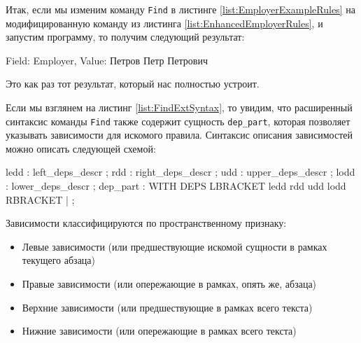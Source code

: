 Итак, если мы изменим команду \lstinline{Find} в листинге \ref{list:EmployerExampleRules} на модифицированную команду из листинга \ref{list:EnhancedEmployerRules}, и запустим программу, то получим следующий результат:
\begin{Verb}
Field: Employer, Value: Петров Петр Петрович
\end{Verb}
Это как раз тот результат, который нас полностью устроит.

Если мы взглянем на листинг \ref{list:FindExtSyntax}, то увидим, что расширенный синтаксис команды \lstinline{Find} также содержит сущность \lstinline{dep_part}, которая позволяет указывать зависимости для искомого правила. Синтаксис описания зависимостей можно описать следующей схемой:
\begin{Verb}
ledd
    : left_deps_descr
    ;
rdd
    : right_deps_descr
    ;
udd
    : upper_deps_descr
    ;
lodd
    : lower_deps_descr
    ;
dep_part
    : WITH DEPS LBRACKET ledd rdd udd lodd RBRACKET
    | %
    ;
\end{Verb}
Зависимости классифицируются по пространственному признаку: 
\begin{itemize}
  \item Левые зависимости (или предшествующие искомой сущности в рамках текущего абзаца)
  \item Правые зависимости (или опережающие в рамках, опять же, абзаца)
  \item Верхние зависимости (или предшествующие в рамках всего текста)
  \item Нижние зависимости (или опережающие в рамках всего текста)
\end{itemize}

